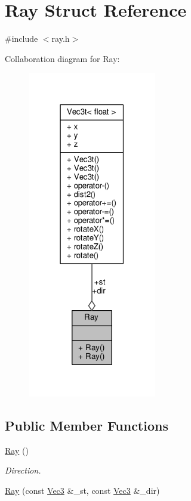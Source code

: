 \hypertarget{structRay}{}\section{Ray Struct Reference}
\label{structRay}


{\ttfamily \#include $<$ray.\+h$>$}



Collaboration diagram for Ray\+:\nopagebreak
\begin{figure}[H]
\begin{center}
\leavevmode
\includegraphics[width=159pt]{structRay__coll__graph}
\end{center}
\end{figure}
\subsection*{Public Member Functions}
\begin{DoxyCompactItemize}
\item 
\hyperlink{structRay_a2e3d2c29f2df4ab3da10da79d4acb852}{Ray} ()
\begin{DoxyCompactList}\small\item\em Direction. \end{DoxyCompactList}\item 
\hyperlink{structRay_a8cf3788de5062520f18684918b0347d8}{Ray} (const \hyperlink{vec_8h_ae4fcaa7c0a3935930ed1be5f70b90373}{Vec3} \&\+\_\+st, const \hyperlink{vec_8h_ae4fcaa7c0a3935930ed1be5f70b90373}{Vec3} \&\+\_\+dir)
\end{DoxyCompactItemize}
